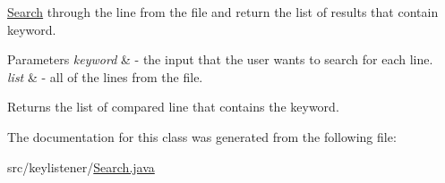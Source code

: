 \hyperlink{classkeylistener_1_1_search}{Search} through the line from the file and return the list of results that contain keyword. 
\begin{DoxyParams}{Parameters}
{\em keyword} & -\/ the input that the user wants to search for each line. \\
\hline
{\em list} & -\/ all of the lines from the file. \\
\hline
\end{DoxyParams}
\begin{DoxyReturn}{Returns}
the list of compared line that contains the keyword. 
\end{DoxyReturn}


The documentation for this class was generated from the following file\+:\begin{DoxyCompactItemize}
\item 
src/keylistener/\hyperlink{_search_8java}{Search.\+java}\end{DoxyCompactItemize}
